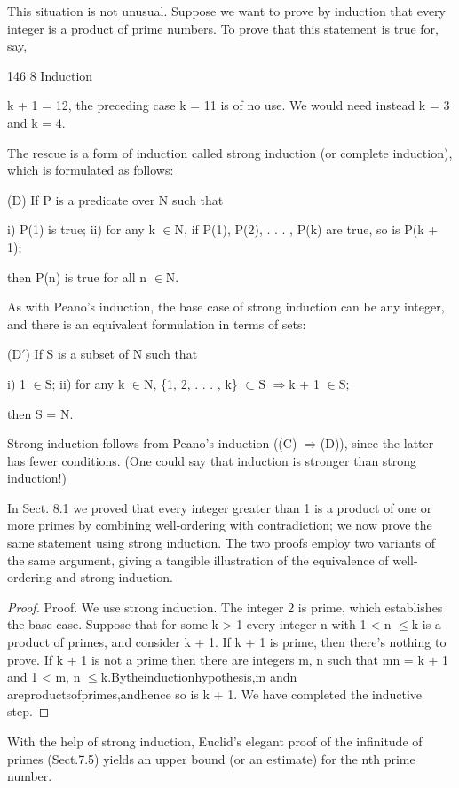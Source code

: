 \documentclass[11pt]{article}
\theoremstyle{plain}
\theoremstyle{definition}
\begin{document}
This situation is not unusual. Suppose we want to prove by induction that every integer is a product of prime numbers. To prove that this statement is true for, say,

146 8 Induction

k + 1 = 12, the preceding case k = 11 is of no use. We would need instead k = 3 and k = 4.

The rescue is a form of induction called strong induction (or complete induction), which is formulated as follows:

(D) If P is a predicate over N such that

i) P(1) is true; ii) for any k $\in$N, if P(1), P(2), . . . , P(k) are true, so is P(k + 1);

then P(n) is true for all n $\in$N.

As with Peano's induction, the base case of strong induction can be any integer, and there is an equivalent formulation in terms of sets:

(D$'$) If S is a subset of N such that

i) 1 $\in$S; ii) for any k $\in$N, \{1, 2, . . . , k\} $\subset$S $\Rightarrow$k + 1 $\in$S;

then S = N.

Strong induction follows from Peano's induction ((C) $\Rightarrow$(D)), since the latter has fewer conditions. (One could say that induction is stronger than strong induction!)

In Sect. 8.1 we proved that every integer greater than 1 is a product of one or more primes by combining well-ordering with contradiction; we now prove the same statement using strong induction. The two proofs employ two variants of the same argument, giving a tangible illustration of the equivalence of well-ordering and strong induction.

\begin{proof}
Proof. We use strong induction. The integer 2 is prime, which establishes the base case. Suppose that for some k > 1 every integer n with 1 < n $\leq$k is a product of primes, and consider k + 1. If k + 1 is prime, then there's nothing to prove. If k + 1 is not a prime then there are integers m, n such that mn = k + 1 and 1 < m, n $\leq$k.Bytheinductionhypothesis,m andn areproductsofprimes,andhence so is k + 1. We have completed the inductive step. 
\end{proof}

With the help of strong induction, Euclid's elegant proof of the infinitude of primes (Sect.7.5) yields an upper bound (or an estimate) for the nth prime number.
\end{document}
